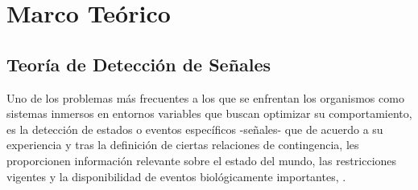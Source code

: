 \chapter{Marco Teórico} %

\label{Cap_SDT} %


\newcommand{\keyword}[1]{\textbf{#1}}
\newcommand{\tabhead}[1]{\textbf{#1}}
\newcommand{\code}[1]{\texttt{#1}}
\newcommand{\file}[1]{\texttt{\bfseries#1}}
\newcommand{\option}[1]{\texttt{\itshape#1}}


\section{Teoría de Detección de Señales}

Uno de los problemas más frecuentes a los que se enfrentan los organismos como sistemas inmersos en entornos variables que buscan optimizar su comportamiento, es la detección de estados o eventos específicos -señales- que de acuerdo a su experiencia y tras la definición de ciertas relaciones de contingencia, les proporcionen información relevante sobre el estado del mundo, las restricciones vigentes y la disponibilidad de eventos biológicamente importantes, \parencite{McNicol1}.\\

